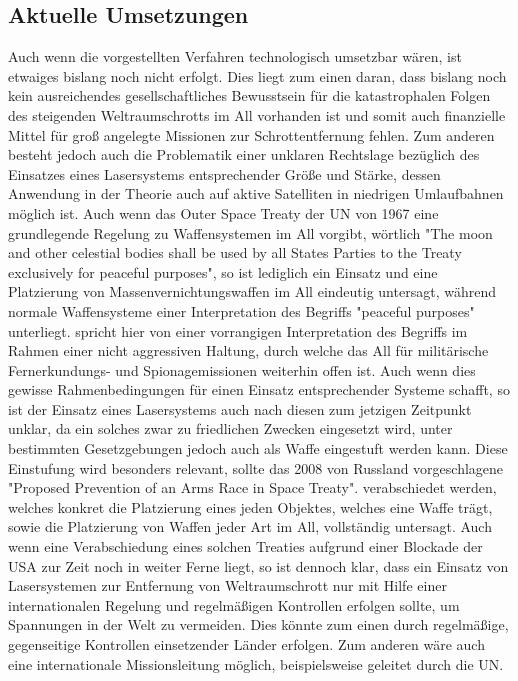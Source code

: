 \documentclass{article}
\begin{document}
\subsection{Aktuelle Umsetzungen}
Auch wenn die vorgestellten Verfahren technologisch umsetzbar wären, ist etwaiges bislang noch nicht erfolgt. Dies liegt zum einen daran, dass bislang noch kein ausreichendes gesellschaftliches Bewusstsein für die katastrophalen Folgen des steigenden Weltraumschrotts im All vorhanden ist und somit auch finanzielle Mittel für groß angelegte Missionen zur Schrottentfernung fehlen. Zum anderen besteht jedoch auch die Problematik einer unklaren Rechtslage bezüglich des Einsatzes eines Lasersystems entsprechender Größe und Stärke, dessen Anwendung in der Theorie auch auf aktive Satelliten in niedrigen Umlaufbahnen möglich ist. Auch wenn das Outer Space Treaty der UN von 1967 \citep{unost} eine grundlegende Regelung zu Waffensystemen im All vorgibt, wörtlich "The moon and other celestial bodies shall be used by all States Parties to the Treaty exclusively for peaceful purposes", so ist lediglich ein Einsatz und eine Platzierung von Massenvernichtungswaffen im All eindeutig untersagt, während normale Waffensysteme einer Interpretation des Begriffs "peaceful purposes" unterliegt. \citet{spacelaw} spricht hier von einer vorrangigen Interpretation des Begriffs im Rahmen einer nicht aggressiven Haltung, durch welche das All für militärische Fernerkundungs- und Spionagemissionen weiterhin offen ist. Auch wenn dies gewisse Rahmenbedingungen für einen Einsatz entsprechender Systeme schafft, so ist der Einsatz eines Lasersystems auch nach diesen zum jetzigen Zeitpunkt unklar, da ein solches zwar zu friedlichen Zwecken eingesetzt wird, unter bestimmten Gesetzgebungen jedoch auch als Waffe eingestuft werden kann. Diese Einstufung wird besonders relevant, sollte das 2008 von Russland vorgeschlagene "Proposed Prevention of an Arms Race in Space Treaty". \citet{unparos} verabschiedet werden, welches konkret die Platzierung eines jeden Objektes, welches eine Waffe trägt, sowie die Platzierung von Waffen jeder Art im All, vollständig untersagt. Auch wenn eine Verabschiedung eines solchen Treaties aufgrund einer Blockade der USA \citep{spacelaw} zur Zeit noch in weiter Ferne liegt, so ist dennoch klar, dass ein Einsatz von Lasersystemen zur Entfernung von Weltraumschrott nur mit Hilfe einer internationalen Regelung und regelmäßigen Kontrollen erfolgen sollte, um Spannungen in der Welt zu vermeiden. Dies könnte zum einen durch regelmäßige, gegenseitige Kontrollen einsetzender Länder erfolgen. Zum anderen wäre auch eine internationale Missionsleitung möglich, beispielsweise geleitet durch die UN.

\clearpage

\end{document}
